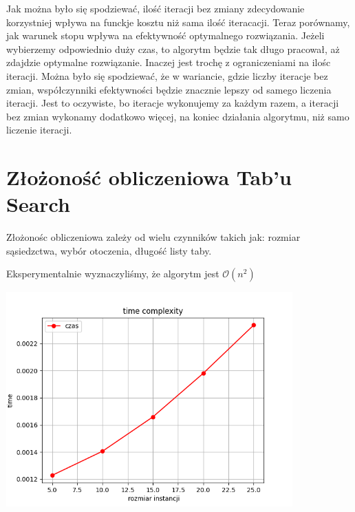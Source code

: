 \documentclass{article}
\begin{document}
    Jak można było się spodziewać, ilość iteracji bez zmiany zdecydowanie korzystniej 
    wpływa na funckje kosztu niż sama ilość iteracacji. Teraz porównamy, jak
    warunek stopu wpływa na efektywność optymalnego rozwiązania. Jeżeli wybierzemy odpowiednio duży czas,
    to algorytm będzie tak długo pracował, aż zdajdzie optymalne rozwiązanie. Inaczej jest trochę
    z ograniczeniami na ilośc iteracji. Można było się spodziewać, że w wariancie, gdzie liczby iteracje
    bez zmian, współczynniki  efektywności będzie znacznie lepszy od samego liczenia iteracji.
    Jest to oczywiste, bo iteracje wykonujemy za każdym razem, a iteracji bez zmian wykonamy dodatkowo więcej,
    na koniec działania algorytmu, niż samo liczenie iteracji.

    \section{Złożoność obliczeniowa Tab'u Search}

    Złożonośc obliczeniowa zależy od wielu czynników takich jak:
    rozmiar sąsiedzctwa, wybór otoczenia, długość listy taby.


    Eksperymentalnie wyznaczyliśmy, że algorytm jest $\mathcal{O}(n^2)$

    \includegraphics[width=11cm]{./spr2img/Figure_11.png}
\end{document}
